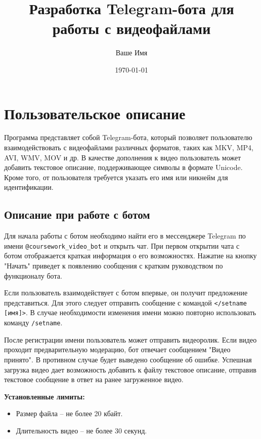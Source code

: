 \documentclass[12pt,a4paper]{article}
\title{Разработка Telegram-бота для работы с видеофайлами}
\author{Ваше Имя}
\date{\today}
\begin{document}
\maketitle
\newpage

\tableofcontents
\newpage

\section{Пользовательское описание}
Программа представляет собой Telegram-бота, который позволяет пользователю взаимодействовать с видеофайлами различных форматов, таких как MKV, MP4, AVI, WMV, MOV и др. В качестве дополнения к видео пользователь может добавить текстовое описание, поддерживающее символы в формате Unicode. Кроме того, от пользователя требуется указать его имя или никнейм для идентификации.

\subsection{Описание при работе с ботом}
Для начала работы с ботом необходимо найти его в мессенджере Telegram по имени \texttt{@coursework\_video\_bot} и открыть чат. При первом открытии чата с ботом отображается краткая информация о его возможностях. Нажатие на кнопку "Начать" приведет к появлению сообщения с кратким руководством по функционалу бота.

Если пользователь взаимодействует с ботом впервые, он получит предложение представиться. Для этого следует отправить сообщение с командой \texttt{</setname [имя]>}. В случае необходимости изменения имени можно повторно использовать команду \texttt{/setname}.

После регистрации имени пользователь может отправить видеоролик. Если видео проходит предварительную модерацию, бот отвечает сообщением "Видео принято". В противном случае будет выведено сообщение об ошибке. Успешная загрузка видео дает возможность добавить к файлу текстовое описание, отправив текстовое сообщение в ответ на ранее загруженное видео.

\textbf{Установленные лимиты:}
\begin{itemize}
    \item Размер файла – не более 20 кбайт.
    \item Длительность видео – не более 30 секунд.
\end{itemize}
\end{document}
